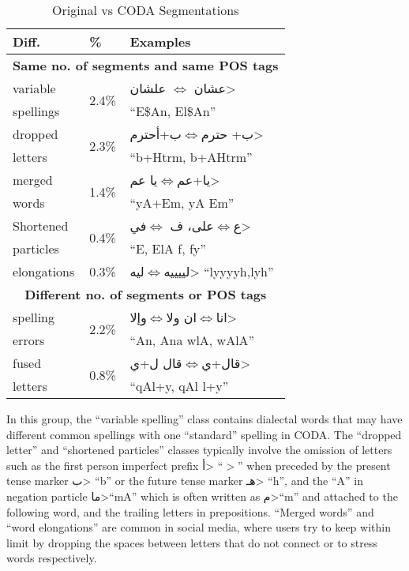 \documentclass[11pt,letterpaper]{article}
\begin{document}
\begin{table}[h]
\begin{center}
\begin{tabular}{|l|l|l|}
\hline \bf Diff. & \textbf{\%} & \textbf{Examples} \\ \hline
\multicolumn{3}{|c|}{\textbf{Same no. of segments and same POS tags}} \\ \hline
variable	  & \multirow{2}{*}{2.4\%} & \<عشان $\Leftrightarrow$ علشان> \\
spellings &      & ``E\$An, El\$An''\\ \hline
dropped & \multirow{2}{*}{2.3\%} & \<ب+ حترم$\Leftrightarrow$ب+أحترم> \\
letters &      & ``b+Htrm, b+AHtrm''\\\hline
merged & \multirow{2}{*}{1.4\%}  &   \<يا+عم$\Leftrightarrow$يا عم> \\
words  &      & ``yA+Em, yA Em''\\\hline
Shortened  & \multirow{2}{*}{0.4\%}  &   \<ع$\Leftrightarrow$على، ف $\Leftrightarrow$في>\\
particles      &      &   ``E, ElA  f, fy''\\\hline
elongations & \multirow{1}{*}{0.3\%}  & \<لييييه$\Leftrightarrow$ليه> ``lyyyyh,lyh''             \\\hline
\multicolumn{3}{|c|}{\textbf{Different no. of segments or POS tags}} \\ \hline
spelling & \multirow{2}{*}{2.2\%}  &  \<انا$\Leftrightarrow$ان  ولا$\Leftrightarrow$وإلا>\\
errors &      & ``ِAn, Ana   wlA, wAlA''\\
\hline
fused & \multirow{2}{*}{0.8\%} & \<قال+ي$\Leftrightarrow$قال ل+ي>\\
letters &      & ``qAl+y, qAl l+y'' \\\hline
\end{tabular}
\end{center}
\caption{Original vs CODA Segmentations}
\label{OriginalCODASegmentation}
\end{table}

In this group, the ``variable spelling'' class contains dialectal words that may have different common spellings with one ``standard'' spelling in CODA. The ``dropped letter'' and ``shortened particles'' classes typically involve the omission of letters such as the first person imperfect prefix \<أ> ``$>$'' when preceded by the present tense marker \<ب> ``b'' or the future tense marker \<هـ> ``h'', and the ``A'' in negation particle \<ما>``mA'' which is often written as \<م>``m'' and attached to the following word, and the trailing letters in prepositions. ``Merged words'' and ``word elongations'' are common in social media, where users try to keep within limit by dropping the spaces between letters that do not connect or to stress words respectively.
\end{document}
